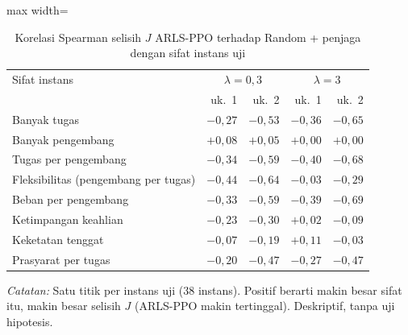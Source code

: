 \begin{table}[htbp]
\caption{Korelasi Spearman selisih $J$ ARLS-PPO terhadap Random + penjaga dengan sifat instans uji}
\label{tab:uji-sifat-acak-g}
\centering\footnotesize
\setlength{\tabcolsep}{4pt}
\begin{adjustbox}{max width=\textwidth}
\begin{tabular}{lrrrr}
\toprule
Sifat instans & \multicolumn{2}{c}{$\lambda=0{,}3$} & \multicolumn{2}{c}{$\lambda=3$} \\
 & uk.~1 & uk.~2 & uk.~1 & uk.~2 \\
\midrule
Banyak tugas & $-0{,}27$ & $-0{,}53$ & $-0{,}36$ & $-0{,}65$ \\
Banyak pengembang & $+0{,}08$ & $+0{,}05$ & $+0{,}00$ & $+0{,}00$ \\
Tugas per pengembang & $-0{,}34$ & $-0{,}59$ & $-0{,}40$ & $-0{,}68$ \\
Fleksibilitas (pengembang per tugas) & $-0{,}44$ & $-0{,}64$ & $-0{,}03$ & $-0{,}29$ \\
Beban per pengembang & $-0{,}33$ & $-0{,}59$ & $-0{,}39$ & $-0{,}69$ \\
Ketimpangan keahlian & $-0{,}23$ & $-0{,}30$ & $+0{,}02$ & $-0{,}09$ \\
Keketatan tenggat & $-0{,}07$ & $-0{,}19$ & $+0{,}11$ & $-0{,}03$ \\
Prasyarat per tugas & $-0{,}20$ & $-0{,}47$ & $-0{,}27$ & $-0{,}47$ \\
\bottomrule
\end{tabular}
\end{adjustbox}
\par\smallskip\footnotesize\textit{Catatan:} Satu titik per instans uji (38 instans). Positif berarti makin besar sifat itu, makin besar selisih $J$ (ARLS-PPO makin tertinggal). Deskriptif, tanpa uji hipotesis.
\end{table}
